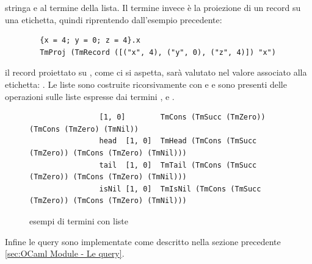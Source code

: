         stringa e al termine della lista. Il termine  invece è la proiezione di un record su una etichetta, quindi riprentendo dall'esempio precedente: 
        \begin{verbatim}
        {x = 4; y = 0; z = 4}.x 
        TmProj (TmRecord ([("x", 4), ("y", 0), ("z", 4)]) "x")
        \end{verbatim}
        il record proiettato su , come ci si aspetta, sarà valutato nel valore associato alla etichetta: .
        Le liste sono costruite ricorsivamente con  e  e sono presenti delle operazioni sulle liste espresse dai termini ,
         e .
        \begin{figure}[h]
            \begin{verbatim}
                [1, 0]        TmCons (TmSucc (TmZero)) (TmCons (TmZero) (TmNil))
                head  [1, 0]  TmHead (TmCons (TmSucc (TmZero)) (TmCons (TmZero) (TmNil)))
                tail  [1, 0]  TmTail (TmCons (TmSucc (TmZero)) (TmCons (TmZero) (TmNil)))
                isNil [1, 0]  TmIsNil (TmCons (TmSucc (TmZero)) (TmCons (TmZero) (TmNil)))
            \end{verbatim}
        \caption{esempi di termini con liste}
        \end{figure}
        Infine le query sono implementate come descritto nella sezione precedente \ref{sec:OCaml Module - Le query}.
        

